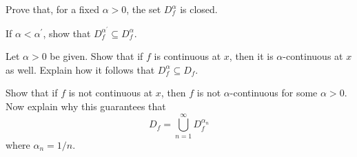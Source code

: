 \begin{exercise}
  Prove that, for a fixed $\alpha>0$, the set $D_{f}^{\alpha}$ is closed.
\end{exercise}
\begin{solution}
  \TODO
\end{solution}

\begin{exercise}
  If $\alpha<\alpha^{\prime}$, show that $D_{f}^{\alpha^{\prime}} \subseteq D_{f}^{\alpha}$.
\end{exercise}
\begin{solution}
  \TODO
\end{solution}

\begin{exercise}
  Let $\alpha>0$ be given. Show that if $f$ is continuous at $x$, then it is $\alpha$-continuous at $x$ as well. Explain how it follows that $D_{f}^{\alpha} \subseteq D_{f}$.
\end{exercise}
\begin{solution}
  \TODO
\end{solution}

\begin{exercise}
  Show that if $f$ is not continuous at $x$, then $f$ is not $\alpha$-continuous for some $\alpha>0$. Now explain why this guarantees that
  $$
  D_{f}=\bigcup_{n=1}^{\infty} D_{f}^{\alpha_{n}}
  $$
  where $\alpha_{n}=1 / n$.
\end{exercise}
\begin{solution}
  \TODO
\end{solution}
